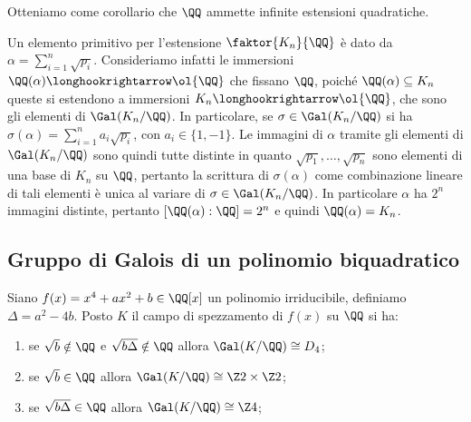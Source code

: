 \documentclass[11pt]{scrartcl}
\begin{document}
	\begin{remark}
		Otteniamo come corollario che $\QQ$ ammette infinite estensioni quadratiche.
	\end{remark}
	
	\begin{remark}
		Un elemento primitivo per l'estensione $\faktor{K_n}{\QQ}$ è dato da 
		$\alpha =\displaystyle \sum_{i = 1}^n \sqrt{p_i}$. Consideriamo infatti le immersioni
		$\QQ(\alpha) \longhookrightarrow \ol{\QQ}$ che fissano $\QQ$, poiché 
		$\QQ(\alpha) \subseteq K_n$ queste si estendono a immersioni
		$K_n \longhookrightarrow \ol{\QQ}$, che sono gli elementi di $\Gal(K_n/\QQ)$.
		In particolare, se $\sigma \in \Gal(K_n/\QQ)$ si ha 
		$\sigma(\alpha) = \displaystyle\sum_{i = 1}^n a_i\sqrt{p_i}$, con $a_i \in \{1, -1\}$.
		Le immagini di $\alpha$ tramite gli elementi di $\Gal(K_n/\QQ)$ sono 
		quindi tutte distinte in quanto $\sqrt{p_1}, \ldots, \sqrt{p_n}$ sono
		elementi di una base di $K_n$ su $\QQ$, pertanto la scrittura di $\sigma(\alpha)$
		come combinazione lineare di tali elementi è unica al variare di 
		$\sigma \in \Gal(K_n/\QQ)$. In particolare $\alpha$ ha $2^n$ immagini distinte,
		pertanto $[\QQ(\alpha): \QQ] = 2^n$ e quindi $\QQ(\alpha) = K_n$.
	\end{remark}
	
	\newpage
	
	\subsection{Gruppo di Galois di un polinomio biquadratico}
	
	\begin{theorem}
		Siano $f(x) = x^4 + ax^2 + b \in \QQ[x]$ un polinomio irriducibile, definiamo $\Delta = a^2 - 4b$.
		Posto $K$ il campo di spezzamento di $f(x)$ su $\QQ$ si ha:
		\begin{enumerate}[(1)]
			\item se $\sqrt{b} \notin \QQ$ e $\sqrt{b\Delta} \notin \QQ$ allora $\Gal(K/\QQ) \cong D_4$;
			\item se $\sqrt{b} \in \QQ$ allora $\Gal(K/\QQ) \cong \Z2\times\Z2$;
			\item se $\sqrt{b\Delta}\in\QQ$ allora $\Gal(K/\QQ) \cong \Z4$;
		\end{enumerate}
	\end{theorem}
	
\end{document}
